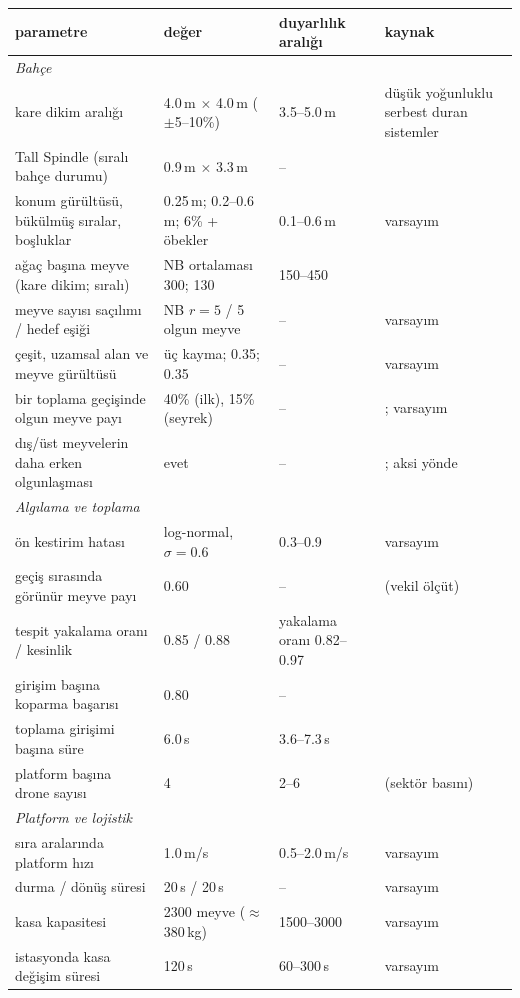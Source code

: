 \begin{tabular}{p{3.3cm}p{2.4cm}p{1.8cm}p{3.4cm}}
\toprule
parametre & değer & duyarlılık aralığı & kaynak \\
\midrule
\multicolumn{4}{l}{\emph{Bahçe}} \\
kare dikim aralığı & 4.0\,m $\times$ 4.0\,m ($\pm$5--10\%) & 3.5--5.0\,m & düşük yoğunluklu serbest duran sistemler \citealp{brawner_2026_wsu,robinson_2008_evolution} \\
Tall Spindle (sıralı bahçe durumu) & 0.9\,m $\times$ 3.3\,m & -- & \citealp{robinson_2011_tallspindle,hoying_nd_tallspindle,reig_2020_longterm} \\
konum gürültüsü, bükülmüş sıralar, boşluklar & 0.25\,m; 0.2--0.6\,m; 6\% + öbekler & 0.1--0.6\,m & varsayım \\
ağaç başına meyve (kare dikim; sıralı) & NB ortalaması 300; 130 & 150--450 & \citealp{francescatto_2020_precision} \\
meyve sayısı saçılımı / hedef eşiği & NB $r=5$ / 5 olgun meyve & -- & varsayım \\
çeşit, uzamsal alan ve meyve gürültüsü & üç kayma; 0.35; 0.35 & -- & varsayım \\
bir toplama geçişinde olgun meyve payı & 40\% (ilk), 15\% (seyrek) & -- & \citealp{simnitt_2023_advancements,hall_2001_effect}; varsayım \\
dış/üst meyvelerin daha erken olgunlaşması & evet & -- & \citealp{roper_2001_when,moran_2022_honeycrisp}; aksi yönde \citealp{kviklys_2022_apple} \\
\midrule
\multicolumn{4}{l}{\emph{Algılama ve toplama}} \\
ön kestirim hatası & log-normal, $\sigma=0.6$ & 0.3--0.9 & varsayım \\
geçiş sırasında görünür meyve payı & 0.60 & -- & \citealp{gongal_2016_apple} (vekil ölçüt) \\
tespit yakalama oranı / kesinlik & 0.85 / 0.88 & yakalama oranı 0.82--0.97 & \citealp{kang_2020_fast,sapkota_2024_comparing,genemola_2020_fruit} \\
girişim başına koparma başarısı & 0.80 & -- & \citealp{silwal_2017_design,zhang_2024_automated,zhu_2025_advancement} \\
toplama girişimi başına süre & 6.0\,s & 3.6--7.3\,s & \citealp{silwal_2017_design,zhang_2024_automated,hohimer_2019_design} \\
platform başına drone sayısı & 4 & 2--6 & \citealp{oitzman_2021_tevel,coxworth_2022_fruitpicking} (sektör basını) \\
\midrule
\multicolumn{4}{l}{\emph{Platform ve lojistik}} \\
sıra aralarında platform hızı & 1.0\,m/s & 0.5--2.0\,m/s & varsayım \\
durma / dönüş süresi & 20\,s / 20\,s & -- & varsayım \\
kasa kapasitesi & 2300 meyve ($\approx$380\,kg) & 1500--3000 & varsayım \\
istasyonda kasa değişim süresi & 120\,s & 60--300\,s & varsayım \\
\bottomrule
\end{tabular}
